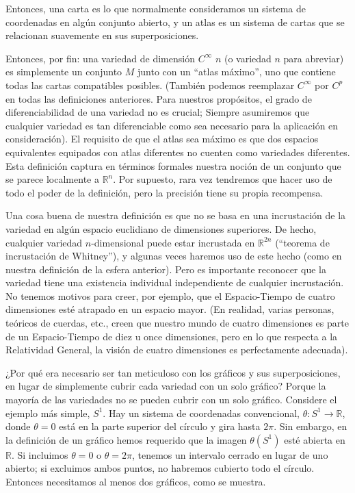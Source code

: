 \documentclass[11pt,b5paper,openany,twoside]{book}
\newcommand{\R}{\mathbb{R}}
\begin{document}
\noindent
Entonces, una carta es lo que normalmente consideramos un sistema de coordenadas en algún conjunto abierto, y un atlas es un sistema de cartas que se relacionan suavemente en sus superposiciones.

Entonces, por fin: una variedad de dimensión $C^\infty$ $n$ (o variedad $n$ para abreviar) es simplemente un conjunto $M$ junto con un ``atlas máximo'', uno que contiene todas las cartas compatibles posibles.
(También podemos reemplazar $C^\infty$ por $C^p$ en todas las definiciones anteriores.
Para nuestros propósitos, el grado de diferenciabilidad de una variedad no es crucial; Siempre asumiremos que cualquier variedad es tan diferenciable como sea necesario para la aplicación en consideración).
El requisito de que el atlas sea máximo es que dos espacios equivalentes equipados con atlas diferentes no cuenten como variedades diferentes.
Esta definición captura en términos formales nuestra noción de un conjunto que se parece localmente a $\mathbb{R}^n$.
Por supuesto, rara vez tendremos que hacer uso de todo el poder de la definición, pero la precisión tiene su propia recompensa.

Una cosa buena de nuestra definición es que no se basa en una incrustación de la variedad en algún espacio euclidiano de dimensiones superiores.
De hecho, cualquier variedad $n$-dimensional puede estar incrustada en $\R^{2n}$ (``teorema de incrustación de Whitney''), y algunas veces haremos uso de este hecho (como en nuestra definición de la esfera anterior).
Pero es importante reconocer que la variedad tiene una existencia individual independiente de cualquier incrustación.
No tenemos motivos para creer, por ejemplo, que el Espacio-Tiempo de cuatro dimensiones esté atrapado en un espacio mayor.
(En realidad, varias personas, teóricos de cuerdas, etc., creen que nuestro mundo de cuatro dimensiones es parte de un Espacio-Tiempo de diez u once dimensiones, pero en lo que respecta a la Relatividad General, la visión de cuatro dimensiones es perfectamente adecuada).

¿Por qué era necesario ser tan meticuloso con los gráficos y sus superposiciones, en lugar de simplemente cubrir cada variedad con un solo gráfico? Porque la mayoría de las variedades no se pueden cubrir con un solo gráfico.
Considere el ejemplo más simple, $S^1$.
Hay un sistema de coordenadas convencional, $\theta: S^1\rightarrow\R$, donde $\theta=0$ está en la parte superior del círculo y gira hasta $2\pi$.
Sin embargo, en la definición de un gráfico hemos requerido que la imagen $\theta(S^1)$ esté abierta en $\R$.
Si incluimos $\theta=0$ o $\theta=2\pi$, tenemos un intervalo cerrado en lugar de uno abierto; si excluimos ambos puntos, no habremos cubierto todo el círculo.
Entonces necesitamos al menos dos gráficos, como se muestra.
\end{document}
